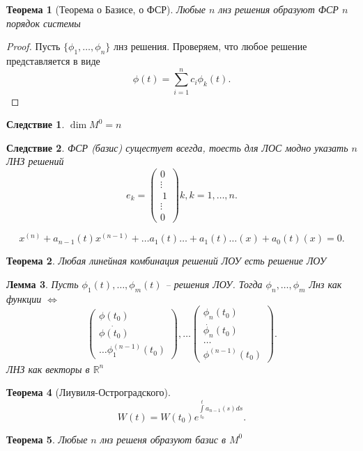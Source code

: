 \documentclass[14pt]{extarticle}
\newtheorem{theorem}{Теорема}
\newtheorem{corollary}{Следствие}[theorem]
\newtheorem{lemma}[theorem]{Лемма}
\begin{document}
\begin{theorem}[Теорема о Базисе, о ФСР]
    Любые $n$ лнз решения образуют ФСР  $n$ порядок системы
\end{theorem}
\begin{proof}
    Пусть $\{\phi_1,\dots,\phi_{n}\}$ лнз решения. Проверяем, что любое решение представляется в виде 
    \[
    \phi(t) = \sum_{i = 1}^{n} c_{i} \phi_{k}(t)
    .\] 
\end{proof}
\begin{corollary}
    $\dim{M^{0}} = n$
\end{corollary}
\begin{corollary}
    ФСР (базис) сущестует всегда, тоесть для ЛОС модно указать $n$ ЛНЗ решений
    \[
        e_{k}  = \begin{pmatrix} 
        0\\
        \vdots\\\
        1\\
        \vdots\\
        0
        \end{pmatrix} k, k = 1,\dots,n
    .\] 
\end{corollary}
\[
x^{(n)} + a_{n-1}(t)x^{(n-1)} + \dots a_1(t)\dots + a_1(t) \dots(x) + a_0(t)(x) = 0
.\] 
\begin{theorem}
    Любая линейная комбинация решений ЛОУ есть решение ЛОУ
\end{theorem}
\begin{lemma}
    Пусть $\phi_1(t),\dots,\phi_{m}(t)$ -- решения ЛОУ. Тогда $\phi_{n},\dots,\phi_{m}$ 
    Лнз как функции $\iff$
     \[
    \begin{pmatrix} 
    \phi(t_0) \\
    \dot{\phi(t_0)}\\
    \dots
    \phi_1^{(n-1)} (t_0)
    \end{pmatrix} 
    ,
    \dots
    \begin{pmatrix} 
    \phi_{n} (t_0)\\
    \dot{\phi_{n}}(t_0)\\
    \dots\\
    \phi^{(n-1)}(t_0)

    \end{pmatrix} 
    .\] 
    ЛНЗ как векторы в $\mathbb{R}^{n}$
\end{lemma}
\begin{theorem}[Лиувиля-Остроградского]
    \[
    W(t) = W(t_0) e ^{\int\limits_{t_0}^{t} a_{n-1}(s) ds }
    .\] 
\end{theorem}
\begin{theorem}
    Любые $n$ лнз решеня образуют базис в  $M^{0}$
\end{theorem}
\end{document}
